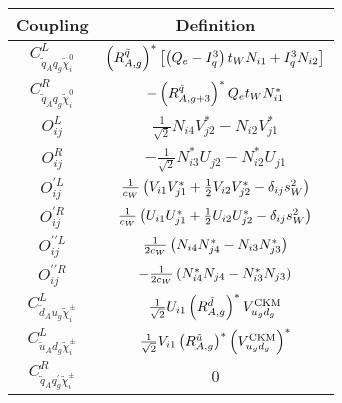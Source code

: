 \documentclass[../main.tex]{subfiles}
\begin{document}
{\renewcommand{\arraystretch}{2}
  \begin{table}[ht!]
    \centering
    \begin{tabular}{|c|c|}
      \hline
      Coupling                                            & Definition
      \\
      \hline
      \(C_{\tilde{q}_A q_g \tilde{\chi}_i^0}^{L}\)        & \(\left(R^{\tilde{q}}_{A,g}\right)^\ast \left[\left(Q_e-I^3_q\right) t_W N_{i1} + I^3_q N_{i2}\right]\)           \\
      \(C_{\tilde{q}_A q_g \tilde{\chi}_i^0}^{R}\)        & \(-\left(R^{\tilde{q}}_{A,g+3}\right)^\ast Q_e t_W N_{i1}^\ast\)                                            \\
      \hline
      \(O_{ij}^L\)                                        & \(\frac{1}{\sqrt{2}} N_{i4} V_{j2}^\ast - N_{i2}V_{j1}^\ast\)                                            \\
      \(O_{ij}^R\)                                        & \(-\frac{1}{\sqrt{2}} N_{i3}^\ast U_{j2} - N_{i2}^\ast U_{j1}\)                                          \\
      \hline
      \(O_{ij}^{\prime L}\)                               & \(\frac{1}{c_W} \left(V_{i1} V_{j1}^\ast + \frac{1}{2} V_{i2}V_{j2}^\ast - \delta_{ij} s_W^2\right)\)       \\
      \(O_{ij}^{\prime R}\)                               & \(\frac{1}{c_W} \left(U_{i1}U_{j1}^\ast + \frac{1}{2} U_{i2}U_{j2}^\ast - \delta_{ij} s_W^2\right)\)        \\
      \hline
      \(O^{\prime\prime L}_{ij}\)                         & \(\frac{1}{2c_W} \left(N_{i4} N_{j4}^\ast - N_{i3} N_{j3}^\ast\right)\)                                     \\
      \(O^{\prime\prime R}_{ij}\)                         & \(-\frac{1}{2c_W} \left(N_{i4}^\ast N_{j4} - N_{i3}^\ast N_{j3}\right)\)                                    \\
      \hline
      \(C_{\tilde{d}_A u_g \tilde{\chi}^\pm_i}^L\)        & \(\frac{1}{\sqrt{2}} U_{i1} \left(R^{\tilde{d}}_{A,g}\right)^\ast V_{u_g d_g}^\text{CKM}\)                  \\
      \(C_{\tilde{u}_A d_g \tilde{\chi}^\pm_i}^L\)        & \(\frac{1}{\sqrt{2}} V_{i1} \left(R^{\tilde{u}}_{A,g}\right)^\ast \left(V_{u_g d_g}^\text{CKM}\right)^\ast\)   \\
      \(C_{\tilde{q}_A q^\prime_g \tilde{\chi}^\pm_i}^R\) & 0                                                                                                        \\

\end{tabular}
\end{table}}
\end{document}
